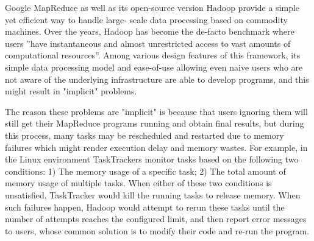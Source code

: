 Google MapReduce as well as its open-source version Hadoop provide a simple yet efficient way to handle large- scale data processing based on commodity machines.
Over the years, Hadoop has become the de-facto benchmark\cite{hayashibara2004varphi} where users ”have instantaneous and almost unrestricted access to vast amounts of computational resources”.
Among various design features of this framework, its simple data processing model and ease-of-use allowing even naive users who are not aware of the underlying infrastructure are able to develop programs, and this might result in "implicit" problems.
\par
The reason these problems are "implicit" is because that users ignoring them will still get their MapReduce programs running and obtain final results, but during this process, many tasks may be rescheduled and restarted due to memory failures which might render execution delay and memory wastes. 
For example, in the Linux environment TaskTrackers monitor tasks based on the following two conditions:  1) The memory usage of a specific task; 2) The total amount of memory usage of multiple tasks. When either of these two conditions is unsatisfied, TaskTracker would kill the running tasks to release memory.
When such failures happen, Hadoop would attempt to rerun these tasks until the number of attempts reaches the configured limit, and then report error messages to users, whose common solution is to modify their code and re-run the program.
\par

